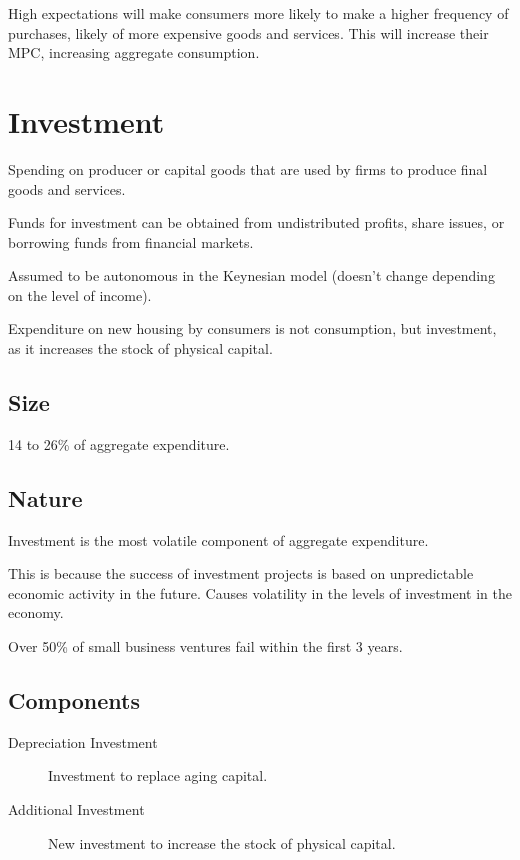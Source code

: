 \documentclass[a4paper,11pt]{report}
\begin{document}
High expectations will make consumers more likely to make a higher frequency of
purchases, likely of more expensive goods and services. This will increase their
MPC, increasing aggregate consumption.


\section{Investment}

Spending on producer or capital goods that are used by firms to produce final
goods and services.

Funds for investment can be obtained from undistributed profits, share issues,
or borrowing funds from financial markets.

Assumed to be autonomous in the Keynesian model (doesn't change depending on
the level of income).

Expenditure on new housing by consumers is not consumption, but investment,
as it increases the stock of physical capital.

\subsection{Size}

14 to 26\% of aggregate expenditure.

\subsection{Nature}

Investment is the most volatile component of aggregate expenditure.

This is because the success of investment projects is based on unpredictable
economic activity in the future. Causes volatility in the levels of investment
in the economy.

Over 50\% of small business ventures fail within the first 3 years.

\subsection{Components}

\begin{description}
\item [Depreciation Investment] Investment to replace aging capital.
\item [Additional Investment] New investment to increase the stock of physical
	capital.
\end{description}
\end{document}
